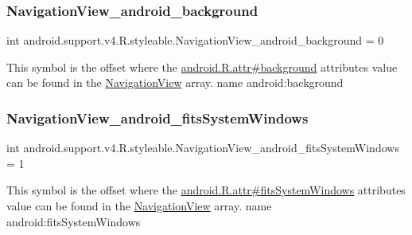 \subsubsection{\texorpdfstring{Navigation\+View\+\_\+android\+\_\+background}{NavigationView\_android\_background}}
{\footnotesize\ttfamily int android.\+support.\+v4.\+R.\+styleable.\+Navigation\+View\+\_\+android\+\_\+background = 0\hspace{0.3cm}{\ttfamily [static]}}

This symbol is the offset where the \hyperlink{}{android.\+R.\+attr\#background} attribute\textquotesingle{}s value can be found in the \hyperlink{classandroid_1_1support_1_1v4_1_1R_1_1styleable_a6e99b86cbaa0c61ca7598c15df537789}{Navigation\+View} array.  name android\+:background \mbox{\label{classandroid_1_1support_1_1v4_1_1R_1_1styleable_a8517e1a9f5ffb52c3548a89bc9417529}} 
\subsubsection{\texorpdfstring{Navigation\+View\+\_\+android\+\_\+fits\+System\+Windows}{NavigationView\_android\_fitsSystemWindows}}
{\footnotesize\ttfamily int android.\+support.\+v4.\+R.\+styleable.\+Navigation\+View\+\_\+android\+\_\+fits\+System\+Windows = 1\hspace{0.3cm}{\ttfamily [static]}}

This symbol is the offset where the \hyperlink{}{android.\+R.\+attr\#fits\+System\+Windows} attribute\textquotesingle{}s value can be found in the \hyperlink{classandroid_1_1support_1_1v4_1_1R_1_1styleable_a6e99b86cbaa0c61ca7598c15df537789}{Navigation\+View} array.  name android\+:fits\+System\+Windows \mbox{\label{classandroid_1_1support_1_1v4_1_1R_1_1styleable_ad0e7d3e854013e3ffc4d6bc317d99c0c}} 
